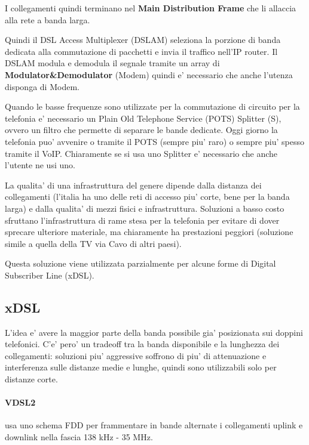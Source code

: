 I collegamenti quindi terminano nel \textbf{Main Distribution Frame} che li allaccia alla rete a banda larga.

Quindi il DSL Access Multiplexer (DSLAM) seleziona la porzione di banda dedicata alla commutazione di pacchetti e invia il traffico nell'IP router.
Il DSLAM modula e demodula il segnale tramite un array di \textbf{Modulator\&Demodulator} (Modem) quindi e' necessario che anche l'utenza disponga di Modem.


Quando le basse frequenze sono utilizzate per la commutazione di circuito per la telefonia e' necessario un Plain Old Telephone Service (POTS) Splitter (S), ovvero un filtro che permette di separare le bande dedicate.
Oggi giorno la telefonia puo' avvenire o tramite il POTS (sempre piu' raro) o sempre piu' spesso tramite il VoIP.
Chiaramente se si usa uno Splitter e' necessario che anche l'utente ne usi uno.

La qualita' di una infrastruttura del genere dipende dalla distanza dei collegamenti (l'italia ha uno delle reti di accesso piu' corte, bene per la banda larga) e dalla qualita' di mezzi fisici e infrastruttura.
Soluzioni a basso costo sfruttano l'infrastruttura di rame stesa per la telefonia per evitare di dover sprecare ulteriore materiale, ma chiaramente ha prestazioni peggiori (soluzione simile a quella della TV via Cavo di altri paesi).

Questa soluzione viene utilizzata parzialmente per alcune forme di Digital Subscriber Line (xDSL).

\subsection{xDSL}

L'idea e' avere la maggior parte della banda possibile gia' posizionata sui doppini telefonici. C'e' pero' un tradeoff tra la banda disponibile e la lunghezza dei collegamenti: soluzioni piu' aggressive soffrono di piu' di attenuazione e interferenza sulle distanze medie e lunghe, quindi sono utilizzabili solo per distanze corte.


\paragraph{VDSL2} usa uno schema FDD per frammentare in bande alternate i collegamenti uplink e downlink nella fascia 138 kHz - 35 MHz.

